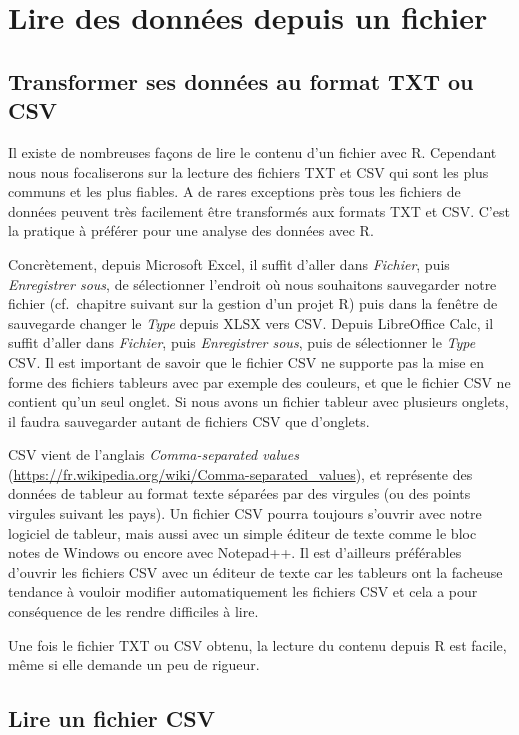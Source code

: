 \documentclass[]{book}
\theoremstyle{definition}
\theoremstyle{definition}
\theoremstyle{definition}
\theoremstyle{remark}
\begin{document}
\section{Lire des données depuis un fichier}\label{l016read}

\subsection{Transformer ses données au format TXT ou
CSV}\label{l016transfo}

Il existe de nombreuses façons de lire le contenu d'un fichier avec R.
Cependant nous nous focaliserons sur la lecture des fichiers TXT et CSV
qui sont les plus communs et les plus fiables. A de rares exceptions
près tous les fichiers de données peuvent très facilement être
transformés aux formats TXT et CSV. C'est la pratique à préférer pour
une analyse des données avec R.

Concrètement, depuis Microsoft Excel, il suffit d'aller dans
\emph{Fichier}, puis \emph{Enregistrer sous}, de sélectionner l'endroit
où nous souhaitons sauvegarder notre fichier (cf.~chapitre suivant sur
la gestion d'un projet R) puis dans la fenêtre de sauvegarde changer le
\emph{Type} depuis XLSX vers CSV. Depuis LibreOffice Calc, il suffit
d'aller dans \emph{Fichier}, puis \emph{Enregistrer sous}, puis de
sélectionner le \emph{Type} CSV. Il est important de savoir que le
fichier CSV ne supporte pas la mise en forme des fichiers tableurs avec
par exemple des couleurs, et que le fichier CSV ne contient qu'un seul
onglet. Si nous avons un fichier tableur avec plusieurs onglets, il
faudra sauvegarder autant de fichiers CSV que d'onglets.

CSV vient de l'anglais \emph{Comma-separated values}
(\url{https://fr.wikipedia.org/wiki/Comma-separated_values}), et
représente des données de tableur au format texte séparées par des
virgules (ou des points virgules suivant les pays). Un fichier CSV
pourra toujours s'ouvrir avec notre logiciel de tableur, mais aussi avec
un simple éditeur de texte comme le bloc notes de Windows ou encore avec
Notepad++. Il est d'ailleurs préférables d'ouvrir les fichiers CSV avec
un éditeur de texte car les tableurs ont la facheuse tendance à vouloir
modifier automatiquement les fichiers CSV et cela a pour conséquence de
les rendre difficiles à lire.

Une fois le fichier TXT ou CSV obtenu, la lecture du contenu depuis R
est facile, même si elle demande un peu de rigueur.

\subsection{Lire un fichier CSV}\label{l016readCSV}
\end{document}
